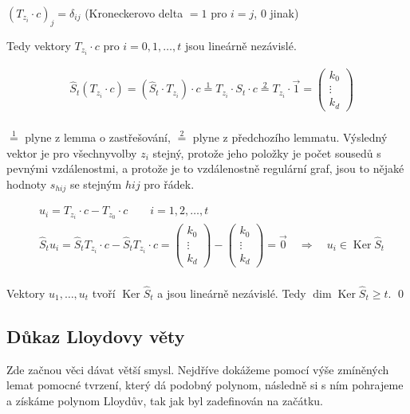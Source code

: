\documentclass[a4paper,12pt,titlepage]{article}
\DeclareMathOperator{\Ker}{Ker}
\begin{document}
$(T_{z_i} \cdot c)_j = \delta_{ij}$ (Kroneckerovo delta $= 1$ pro $i=j$, $0$ jinak)

Tedy vektory $T_{z_i} \cdot c$ pro $i = 0, 1, \dots, t$ jsou lineárně nezávislé.

\begin{align*}
	&\widehat S_t(T_{z_i}\cdot c) = (\widehat S_t \cdot T_{z_i}) \cdot c \overset{1}{=} T_{z_i} \cdot S_t \cdot c \overset{2}{=} T_{z_i}\cdot \vec 1 = \left(\begin{matrix}
		k_0 \\ \vdots \\ k_d
	\end{matrix}\right) \\
\end{align*}

$\overset{1}{=}$ plyne z lemma o zastřešování, $\overset{2}{=}$ plyne z předchozího lemmatu. Výsledný vektor je pro všechnyvolby $z_i$ stejný, protože jeho položky je počet sousedů s pevnými vzdálenostmi, a protože je to vzdálenostně regulární graf, jsou to nějaké hodnoty $s_{hij}$ se stejným $hij$ pro řádek.

\begin{align*}
	&u_i = T_{z_i}\cdot c - T_{z_0}\cdot c\qquad i = 1, 2, \dots, t \\
	&\widehat S_t u_i = \widehat S_t T_{z_i}\cdot c - \widehat S_t T_{z_i}\cdot c = \left(\begin{matrix}k_0 \\ \vdots \\ k_d\end{matrix}\right) - \left(\begin{matrix}k_0 \\ \vdots \\ k_d\end{matrix}\right) = \vec 0 \quad\Rightarrow\quad u_i\in\Ker \widehat S_t\\
\end{align*}

Vektory $u_1,\dots, u_t$ tvoří $\Ker \widehat S_t$ a jsou lineárně nezávislé. Tedy $\dim\Ker\widehat S_t \ge t$.
\qed

\subsection{Důkaz Lloydovy věty}

Zde začnou věci dávat větší smysl. Nejdříve dokážeme pomocí výše zmíněných lemat pomocné tvrzení, který dá podobný polynom, následně si s ním pohrajeme a získáme polynom Lloydův, tak jak byl zadefinován na začátku.
\end{document}
